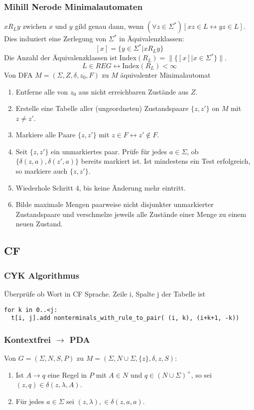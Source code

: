 \documentclass[9pt, a4paper]{article}
\begin{document}
\subsubsection{Mihill Nerode Minimalautomaten}
$xR_Ly$ zwichen $x$ und $y$ gild genau dann, wenn $(\forall z \in \Sigma^*)[xz\in L \leftrightarrow yz \in L]$.
Dies induziert eine Zerlegung von $\Sigma^*$ in Äquivalenzklassen: $$[x] = \{y \in \Sigma^* | xR_Ly\}$$
Die Anzahl der Äquivalenzklassen ist $\text{Index}(R_L) = \|\{[x]|x \in \Sigma^*\}\|$.
$$L\in REG \leftrightarrow \text{Index}(R_L) < \infty$$
Von DFA $M = (\Sigma, Z, \delta, z_0, F)$ zu $M$ äquivalenter Minimalautomat
\begin{enumerate}
	\item Entferne alle von $z_0$ aus nicht erreichbaren Zustände aus $Z$.
	\item Erstelle eine Tabelle aller (ungeordneten) Zustandspaare $\{z, z'\}$ on $M$ mit $z \neq z'$.
	\item Markiere alle Paare $\{z, z'\}$ mit
	$z\in F \leftrightarrow z' \notin F$.
	\item Seit $\{z, z'\}$ ein unmarkiertes paar. Prüfe für jedes $a \in \Sigma$, ob
	$\{\delta(z, a), \delta(z', a)\}$
	bereits markiert ist. Ist mindestens ein Test erfolgreich, so markiere auch $\{z, z'\}$.
	\item Wiederhole Schritt 4, bis keine Änderung mehr eintritt.
	\item Bilde maximale Mengen paarweise nicht disjunkter unmarkierter Zustandspaare und verschmelze jeweils alle Zustände einer Menge zu einem neuen Zustand.
\end{enumerate}

\subsection{CF}
\subsubsection{CYK Algorithmus}
Überprüfe ob Wort in CF Sprache. Zeile i, Spalte j der Tabelle ist
 \begin{lstlisting}
for k in 0..<j:
  t[i, j].add nonterminals_with_rule_to_pair( (i, k), (i+k+1, -k))
 \end{lstlisting}

\subsubsection{Kontextfrei $\to$ PDA}
 Von $G = (\Sigma, N, S, P)$ zu $M = (\Sigma, N\cup\Sigma, \{z\}, \delta, z, S)$:
 \begin{enumerate}
 	\item Ist $A \to q$ eine Regel in $P$ mit $A \in N$ und $q \in (N \cup \Sigma)^+$, so sei $(z, q) \in \delta(z, \lambda, A)$.
 	\item Für jedes $a \in \Sigma$ sei $(z, \lambda), \in \delta(z, a, a)$.
 \end{enumerate}
\end{document}
